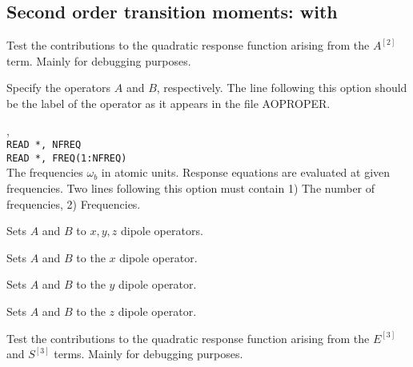 \subsection{Second order transition moments:  with }


\begin{description}

\item{}
Test the contributions to the quadratic response function arising from
the $A^{\left[2\right]}$ term. Mainly for debugging purposes.

\item[\Key{APROP}, \Key{BPROP}]
Specify the operators $A$ and $B$, respectively. The line following this
option should be the label of the operator as it appears in the file
AOPROPER.

\item{, }\\
\verb|READ *, NFREQ|\\
\verb|READ *, FREQ(1:NFREQ)|\\
The frequencies $\omega_b$ in atomic units.
Response equations are evaluated at given
frequencies. Two lines 
following this option must contain 1) The number of frequencies, 2)
Frequencies.

\item{}
Sets $A$ and $B$ to $x, y, z$ dipole operators.

\item{}
Sets $A$ and $B$ to the $x$ dipole operator.

\item{}
Sets $A$ and $B$ to the $y$ dipole operator.

\item{}
Sets $A$ and $B$ to the $z$ dipole operator.

\item{}
Test the contributions to the quadratic response function arising from
the $E^{\left[3\right]}$ and $S^{\left[3\right]}$ terms.  Mainly for
debugging purposes. 


\end{description}
